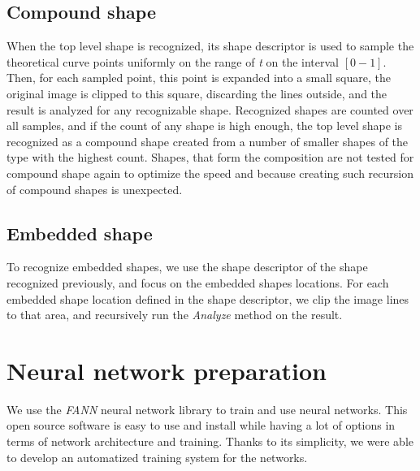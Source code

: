 \subsection{Compound shape}
When the top level shape is recognized, its shape descriptor is used to sample the theoretical curve points uniformly on the range of \emph{t} on the interval $[0-1]$. Then, for each sampled point, this point is expanded into a small square, the original image is clipped to this square, discarding the lines outside, and the result is analyzed for any recognizable shape. Recognized shapes are counted over all samples, and if the count of any shape is high enough, the top level shape is recognized as a compound shape created from a number of smaller shapes of the type with the highest count. Shapes, that form the composition are not tested for compound shape again to optimize the speed and because creating such recursion of compound shapes is unexpected.

\subsection{Embedded shape}
To recognize embedded shapes, we use the shape descriptor of the shape recognized previously, and focus on the embedded shapes locations. For each embedded shape location defined in the shape descriptor, we clip the image lines to that area, and recursively run the \emph{Analyze} method on the result.

\section{Neural network preparation}
We use the \emph{FANN} neural network library to train and use neural networks. This open source software is easy to use and install while having a lot of options in terms of network architecture and training. Thanks to its simplicity, we were able to develop an automatized training system for the networks.

